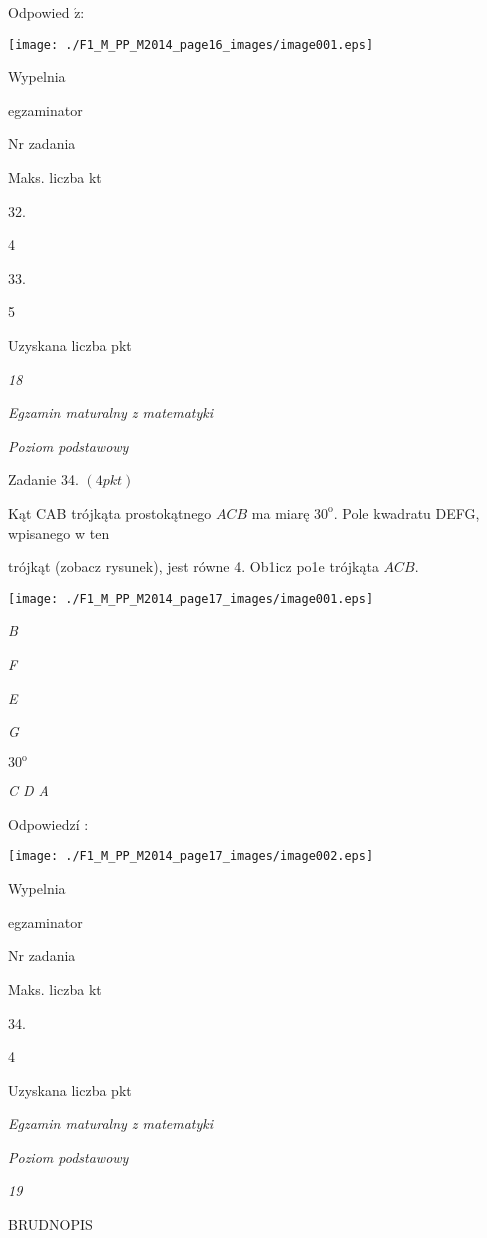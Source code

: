 \documentclass[a4paper,12pt]{article}
\begin{document}
Odpowied $\acute{\mathrm{z}}$:
\begin{center}
\texttt{[image: ./F1\_M\_PP\_M2014\_page16\_images/image001.eps]}
\end{center}
Wypelnia

egzaminator

Nr zadania

Maks. liczba kt

32.

4

33.

5

Uzyskana liczba pkt





{\it 18}

{\it Egzamin maturalny z matematyki}

{\it Poziom podstawowy}

Zadanie 34. $(4pkt)$

Kąt CAB trójkąta prostokątnego $ACB$ ma miarę $30^{\mathrm{o}}$. Pole kwadratu DEFG, wpisanego w ten

trójkąt (zobacz rysunek), jest równe 4. Ob1icz po1e trójkąta $ACB.$
\begin{center}
\texttt{[image: ./F1\_M\_PP\_M2014\_page17\_images/image001.eps]}
\end{center}
{\it B}

{\it F}

{\it E}

{\it G}

$30^{\mathrm{o}}$

{\it C D  A}

Odpowiedzí :
\begin{center}
\texttt{[image: ./F1\_M\_PP\_M2014\_page17\_images/image002.eps]}
\end{center}
Wypelnia

egzaminator

Nr zadania

Maks. liczba kt

34.

4

Uzyskana liczba pkt





{\it Egzamin maturalny z matematyki}

{\it Poziom podstawowy}

{\it 19}

BRUDNOPIS
\end{document}
